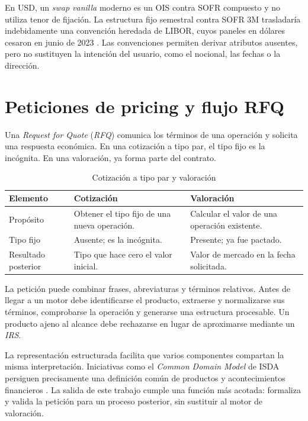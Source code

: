 En USD, un \textit{swap vanilla} moderno es un OIS contra SOFR compuesto y no utiliza tenor de fijación. La estructura fijo semestral contra SOFR 3M trasladaría indebidamente una convención heredada de LIBOR, cuyos paneles en dólares cesaron en junio de 2023 \citep{arrc2023closing}. Las convenciones permiten derivar atributos ausentes, pero no sustituyen la intención del usuario, como el nocional, las fechas o la dirección.

\section{Peticiones de pricing y flujo RFQ}
\label{sec:flujo_rfq}

Una \textit{Request for Quote} (\textit{RFQ}) comunica los términos de una operación y solicita una respuesta económica. En una cotización a tipo par, el tipo fijo es la incógnita. En una valoración, ya forma parte del contrato.

\begin{table}[H]
\centering
\small
\caption{Cotización a tipo par y valoración}
\label{tab:cotizacion_valoracion}
\begin{tabular}{|P{3.2cm}|P{4.8cm}|P{4.8cm}|}
\hline
\textbf{Elemento} & \textbf{Cotización} & \textbf{Valoración} \\
\hline
Propósito & Obtener el tipo fijo de una nueva operación. & Calcular el valor de una operación existente. \\
\hline
Tipo fijo & Ausente; es la incógnita. & Presente; ya fue pactado. \\
\hline
Resultado posterior & Tipo que hace cero el valor inicial. & Valor de mercado en la fecha solicitada. \\
\hline
\end{tabular}
\end{table}

La petición puede combinar frases, abreviaturas y términos relativos. Antes de llegar a un motor debe identificarse el producto, extraerse y normalizarse sus términos, comprobarse la operación y generarse una estructura procesable. Un producto ajeno al alcance debe rechazarse en lugar de aproximarse mediante un \textit{IRS}.

La representación estructurada facilita que varios componentes compartan la misma interpretación. Iniciativas como el \textit{Common Domain Model} de ISDA persiguen precisamente una definición común de productos y acontecimientos financieros \citep{isda2023cdm}. La salida de este trabajo cumple una función más acotada: formaliza y valida la petición para un proceso posterior, sin sustituir al motor de valoración.

